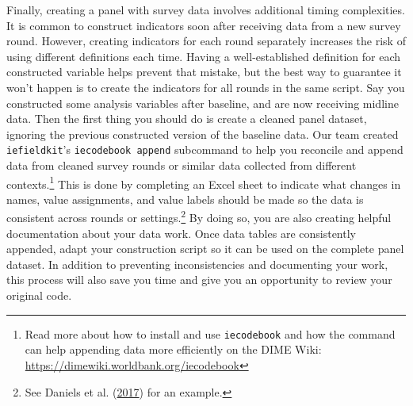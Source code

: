 \documentclass[
]{book}
\begin{document}
Finally, creating a panel with survey data involves additional timing complexities.
It is common to construct indicators soon after receiving data from a new survey round.
However, creating indicators for each round separately increases the risk of using different definitions each time.
Having a well-established definition for each constructed variable helps prevent that mistake,
but the best way to guarantee it won't happen is to create the indicators for all rounds in the same script.
Say you constructed some analysis variables after baseline, and are now receiving midline data.
Then the first thing you should do is create a cleaned panel dataset,
ignoring the previous constructed version of the baseline data.
Our team created \texttt{iefieldkit}'s \texttt{iecodebook\ append} subcommand
to help you reconcile and append data from cleaned survey rounds
or similar data collected from different contexts.\footnote{Read more about how to install and use \texttt{iecodebook} and
  how the command can help appending data more efficiently
  on the DIME Wiki:
  \url{https://dimewiki.worldbank.org/iecodebook}}
This is done by completing an Excel sheet to indicate what changes in
names, value assignments, and value labels should be made so the data is consistent across rounds or settings.\footnote{See Daniels et al. (\protect\hyperlink{ref-daniels2017use}{2017}) for an example.}
By doing so, you are also creating helpful documentation about your data work.
Once data tables are consistently appended,
adapt your construction script so it can be used on the complete panel dataset.
In addition to preventing inconsistencies and documenting your work,
this process will also save you time and give you an opportunity to review your original code.
\end{document}
